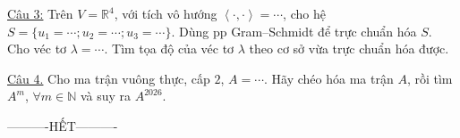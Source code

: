 \documentclass[12pt,a4paper]{article}
\newcommand{\R}{\mathbb{R}}
\newcommand{\N}{\mathbb{N}}
\newcommand{\ip}[2]{\left\langle #1,#2\right\rangle}
\begin{document}
\underline{Câu 3:} Trên $V=\R^4$, với tích vô hướng $\ip{\cdot}{\cdot}=\cdots$, cho hệ
$S=\{u_1=\cdots;u_2=\cdots;u_3=\cdots\}$. Dùng pp Gram--Schmidt để trực chuẩn hóa $S$.
Cho véc tơ $\lambda=\cdots$. Tìm tọa độ của véc tơ $\lambda$ theo cơ sở vừa trực chuẩn hóa được.

\underline{Câu 4.} Cho ma trận vuông thực, cấp $2$, $A=\cdots$. Hãy chéo hóa ma trận $A$, rồi tìm $A^m$, $\forall m\in\N$ và suy ra $A^{2026}$.

\begin{center}
----------HẾT----------
\end{center}
\end{document}
